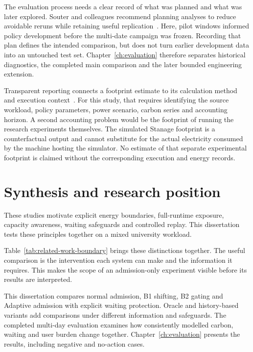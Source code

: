 The evaluation process needs a clear record of what was planned and what was later explored. Souter and colleagues recommend planning analyses to reduce avoidable reruns while retaining useful replication~\citep{souter2023recommendations}. Here, pilot windows informed policy development before the multi-date campaign was frozen. Recording that plan defines the intended comparison, but does not turn earlier development data into an untouched test set. Chapter~\ref{ch:evaluation} therefore separates historical diagnostics, the completed main comparison and the later bounded engineering extension.

Transparent reporting connects a footprint estimate to its calculation method and execution context~\citep{souter2023recommendations}. For this study, that requires identifying the source workload, policy parameters, power scenario, carbon series and accounting horizon. A second accounting problem would be the footprint of running the research experiments themselves. The simulated Stanage footprint is a counterfactual output and cannot substitute for the actual electricity consumed by the machine hosting the simulator. No estimate of that separate experimental footprint is claimed without the corresponding execution and energy records.

\section{Synthesis and research position}

These studies motivate explicit energy boundaries, full-runtime exposure, capacity awareness, waiting safeguards and controlled replay. This dissertation tests these principles together on a mixed university workload.

Table~\ref{tab:related-work-boundary} brings these distinctions together. The useful comparison is the intervention each system can make and the information it requires. This makes the scope of an admission-only experiment visible before its results are interpreted.


This dissertation compares normal admission, B1 shifting, B2 gating and Adaptive admission with explicit waiting protection. Oracle and history-based variants add comparisons under different information and safeguards. The completed multi-day evaluation examines how consistently modelled carbon, waiting and user burden change together. Chapter~\ref{ch:evaluation} presents the results, including negative and no-action cases.
